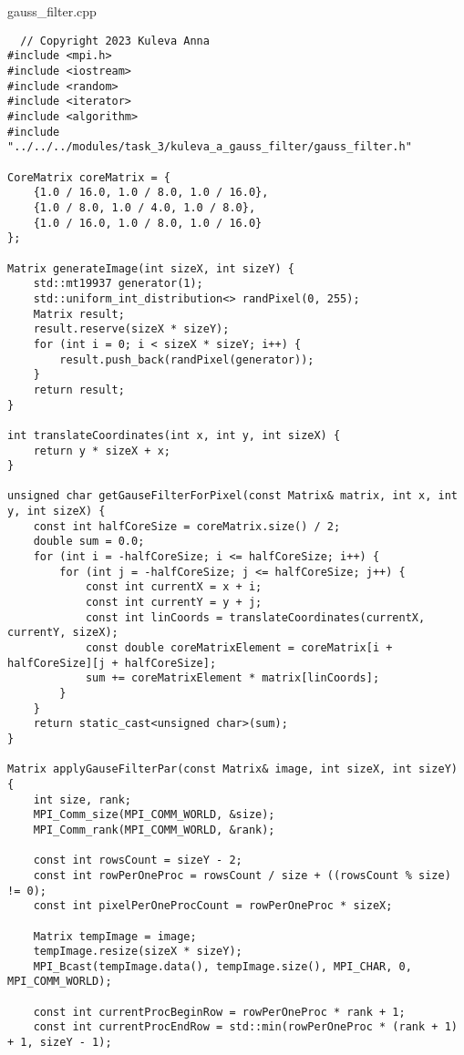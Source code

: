 \documentclass[12pt,a4paper]{article}
\begin{document}
\section{} gauss\_filter.cpp
\begin{lstlisting}
  // Copyright 2023 Kuleva Anna
#include <mpi.h>
#include <iostream>
#include <random>
#include <iterator>
#include <algorithm>
#include "../../../modules/task_3/kuleva_a_gauss_filter/gauss_filter.h"

CoreMatrix coreMatrix = {
    {1.0 / 16.0, 1.0 / 8.0, 1.0 / 16.0},
    {1.0 / 8.0, 1.0 / 4.0, 1.0 / 8.0},
    {1.0 / 16.0, 1.0 / 8.0, 1.0 / 16.0}
};

Matrix generateImage(int sizeX, int sizeY) {
    std::mt19937 generator(1);
    std::uniform_int_distribution<> randPixel(0, 255);
    Matrix result;
    result.reserve(sizeX * sizeY);
    for (int i = 0; i < sizeX * sizeY; i++) {
        result.push_back(randPixel(generator));
    }
    return result;
}

int translateCoordinates(int x, int y, int sizeX) {
    return y * sizeX + x;
}

unsigned char getGauseFilterForPixel(const Matrix& matrix, int x, int y, int sizeX) {
    const int halfCoreSize = coreMatrix.size() / 2;
    double sum = 0.0;
    for (int i = -halfCoreSize; i <= halfCoreSize; i++) {
        for (int j = -halfCoreSize; j <= halfCoreSize; j++) {
            const int currentX = x + i;
            const int currentY = y + j;
            const int linCoords = translateCoordinates(currentX, currentY, sizeX);
            const double coreMatrixElement = coreMatrix[i + halfCoreSize][j + halfCoreSize];
            sum += coreMatrixElement * matrix[linCoords];
        }
    }
    return static_cast<unsigned char>(sum);
}

Matrix applyGauseFilterPar(const Matrix& image, int sizeX, int sizeY) {
    int size, rank;
    MPI_Comm_size(MPI_COMM_WORLD, &size);
    MPI_Comm_rank(MPI_COMM_WORLD, &rank);

    const int rowsCount = sizeY - 2;
    const int rowPerOneProc = rowsCount / size + ((rowsCount % size) != 0);
    const int pixelPerOneProcCount = rowPerOneProc * sizeX;

    Matrix tempImage = image;
    tempImage.resize(sizeX * sizeY);
    MPI_Bcast(tempImage.data(), tempImage.size(), MPI_CHAR, 0, MPI_COMM_WORLD);

    const int currentProcBeginRow = rowPerOneProc * rank + 1;
    const int currentProcEndRow = std::min(rowPerOneProc * (rank + 1) + 1, sizeY - 1);


\end{lstlisting}
\end{document}

